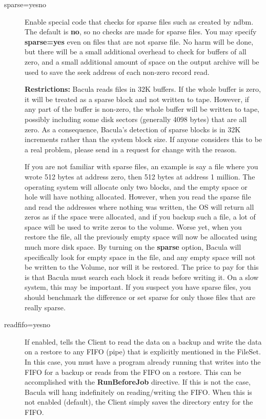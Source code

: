 \begin{description}
\item [sparse=yes\vb{}no]
   Enable special code that checks for sparse files such as created by
   ndbm.  The default is {\bf no}, so no checks are made for sparse files.
   You may specify {\bf sparse=yes} even on files that are not sparse file.
   No harm will be done, but there will be a small additional overhead to
   check for buffers of all zero, and a small additional amount of space on
   the output archive will be used to save the seek address of each
   non-zero record read.

   {\bf Restrictions:} Bacula reads files in 32K buffers.  If the whole
   buffer is zero, it will be treated as a sparse block and not written to
   tape.  However, if any part of the buffer is non-zero, the whole buffer
   will be written to tape, possibly including some disk sectors (generally
   4098 bytes) that are all zero.  As a consequence, Bacula's detection of
   sparse blocks is in 32K increments rather than the system block size.
   If anyone considers this to be a real problem, please send in a request
   for change with the reason.

   If you are not familiar with sparse files, an example is say a file
   where you wrote 512 bytes at address zero, then 512 bytes at address 1
   million.  The operating system will allocate only two blocks, and the
   empty space or hole will have nothing allocated.  However, when you read
   the sparse file and read the addresses where nothing was written, the OS
   will return all zeros as if the space were allocated, and if you backup
   such a file, a lot of space will be used to write zeros to the volume.
   Worse yet, when you restore the file, all the previously empty space
   will now be allocated using much more disk space.  By turning on the
   {\bf sparse} option, Bacula will specifically look for empty space in
   the file, and any empty space will not be written to the Volume, nor
   will it be restored.  The price to pay for this is that Bacula must
   search each block it reads before writing it.  On a slow system, this
   may be important.  If you suspect you have sparse files, you should
   benchmark the difference or set sparse for only those files that are
   really sparse.

\label{readfifo}
\item [readfifo=yes\vb{}no]
   If enabled, tells the Client to read the data on a backup and write the
   data on a restore to any FIFO (pipe) that is explicitly mentioned in the
   FileSet.  In this case, you must have a program already running that
   writes into the FIFO for a backup or reads from the FIFO on a restore.
   This can be accomplished with the {\bf RunBeforeJob} directive.  If this
   is not the case, Bacula will hang indefinitely on reading/writing the
   FIFO. When this is not enabled (default), the Client simply saves the
   directory entry for the FIFO.


\end{description}
